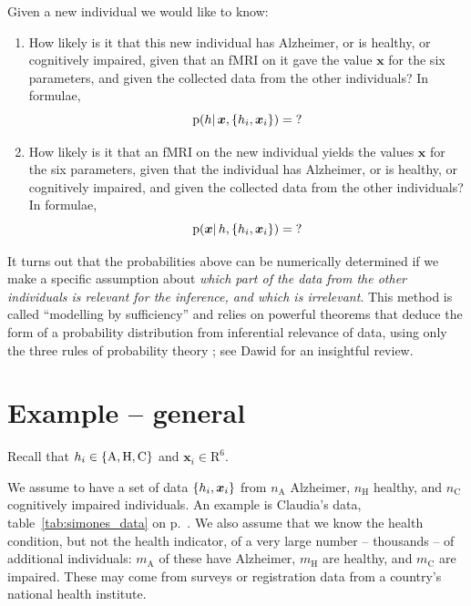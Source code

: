 \documentclass[\ifafour a4paper,12pt,\else a5paper,10pt,\fi%
onecolumn,oneside,article,%
british%
]{memoir}
\theoremstyle{remark}
\theoremstyle{innote}
\newcommand*{\citey}{\parencites*}
\renewcommand*{\cites}{\parencites}
\newcommand*{\RR}{\bm{\mathrm{R}}}
\DeclarePairedDelimiter\set{\{}{\}}
\newcommand*{\pf}{\mathrm{p}}%
\renewcommand*{\|}{\mathpunct{|}}
\newcommand*{\sect}{\S}%
\newcommand*{\chap}{ch.}%
\newcommand*{\eg}{{e.g.}}
\newcommand*{\yH}{h}
\newcommand*{\yx}{x}
\newcommand*{\yxx}{\bm{\yx}}
\newcommand*{\ya}{\mathrm{A}}
\newcommand*{\yi}{\mathrm{C}}
\newcommand*{\yh}{\mathrm{H}}
\newcommand*{\yn}{n}
\newcommand*{\yna}{\yn_{\ya}}
\newcommand*{\ynh}{\yn_{\yh}}
\newcommand*{\yni}{\yn_{\yi}}
\newcommand*{\yNa}{m_{\ya}}
\newcommand*{\yNh}{m_{\yh}}
\newcommand*{\yNi}{m_{\yi}}
\theoremstyle{plain}
\begin{document}
\bigskip

Given a new individual we would like to know:
\begin{enumerate}[wide]
\item How likely is it that this new individual has Alzheimer, or is
  healthy, or cognitively impaired, given that an fMRI on it gave the value
  $\yxx$ for the six parameters, and given the collected data from the
  other individuals? In formulae,
  \begin{equation}
    \label{eq:health_from_fmri}
    \pf(\yH \| \yxx, \set{\yH_i,\yxx_i})=\mathord{?}
  \end{equation}
\item How likely is it that an fMRI on the new individual yields the values
  $\yxx$ for the six parameters, given that the individual has Alzheimer,
  or is healthy, or cognitively impaired, and given the collected data from
  the other individuals? In formulae,
  \begin{equation}
    \label{eq:fmri_from_health}
    \pf(\yxx \| \yH, \set{\yH_i,\yxx_i})=\mathord{?}
  \end{equation}
\end{enumerate}

\smallskip

It turns out that the probabilities above can be numerically determined if
we make a specific assumption about \emph{which part of the data from the
  other individuals is relevant for the inference, and which is
  irrelevant}. This method is called \enquote{modelling by sufficiency}
and relies on powerful theorems that deduce the form of a probability
distribution from inferential relevance of data, using only the three rules
of probability theory
\cites[\eg:][\chap~4]{bernardoetal1994_r2000}[\sect~5.5]{lindley1965b_r2008}{diaconisetal1981,lauritzen1982_r1988,kallenberg2005};
see Dawid \citey{dawid2013} for an insightful review.



\section{Example -- general}
\label{sec:example}

Recall that $\yH_i \in \set{\ya, \yh, \yi}$ and $\yxx_i \in \RR^6$.

We assume to have a set of data $\set{\yH_i,\yxx_i}$ from $\yna$ Alzheimer,
$\ynh$ healthy, and $\yni$ cognitively impaired individuals. An example is
Claudia's data, table~\ref{tab:simones_data} on
p.~\pageref{tab:simones_data}. We also assume that we know the health
condition, but not the health indicator, of a very large number --
thousands -- of additional individuals: $\yNa$ of these have Alzheimer,
$\yNh$ are healthy, and $\yNi$ are impaired. These may come from surveys or
registration data from a country's national health institute.
\end{document}
